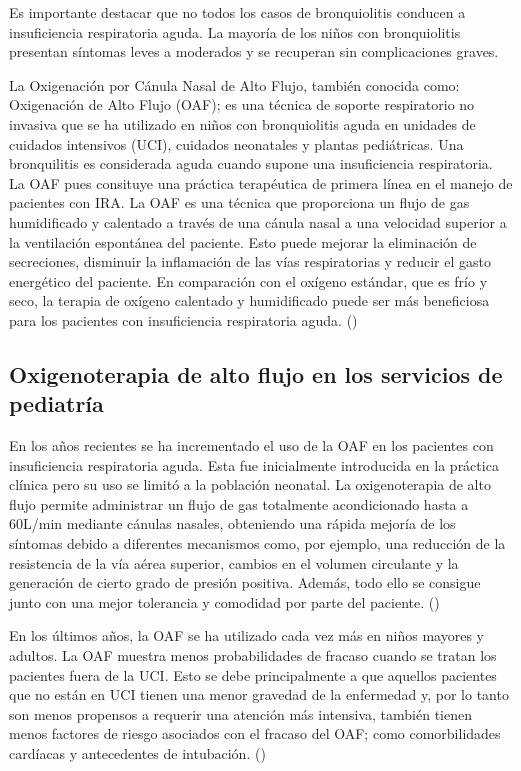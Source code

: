 Es importante destacar que no todos los casos de bronquiolitis conducen a insuficiencia respiratoria aguda. La mayoría de los niños con bronquiolitis presentan síntomas leves a moderados y se recuperan sin complicaciones graves. 

La Oxigenación por Cánula Nasal de Alto Flujo, también conocida como: Oxigenación de Alto Flujo (OAF); es una técnica de soporte respiratorio no invasiva que se ha utilizado en niños con bronquiolitis aguda en unidades de cuidados intensivos (UCI), cuidados neonatales y plantas pediátricas. Una bronquilitis es considerada aguda cuando supone una insuficiencia respiratoria. La OAF pues consituye una práctica terapéutica de primera línea en el manejo de pacientes con IRA. La OAF es una técnica que proporciona un flujo de gas humidificado y calentado a través de una cánula nasal a una velocidad superior a la ventilación espontánea del paciente. Esto puede mejorar la eliminación de secreciones, disminuir la inflamación de las vías respiratorias y reducir el gasto energético del paciente. En comparación con el oxígeno estándar, que es frío y seco, la terapia de oxígeno calentado y humidificado puede ser más beneficiosa para los pacientes con insuficiencia respiratoria aguda. (\cite{Daverio2019})


\subsection{Oxigenoterapia de alto flujo en los servicios de pediatría} 

En los años recientes se ha incrementado el uso de la OAF en los pacientes con insuficiencia respiratoria aguda. Esta fue inicialmente introducida en la práctica clínica pero su uso se limitó a la población neonatal. La oxigenoterapia de alto flujo permite administrar un flujo de gas totalmente acondicionado hasta a 60L/min mediante cánulas nasales, obteniendo una rápida mejoría de los síntomas debido a diferentes mecanismos como, por ejemplo, una reducción de la resistencia de la vía aérea superior, cambios en el volumen circulante y la generación de cierto grado de presión positiva. Además, todo ello se consigue junto con una mejor tolerancia y comodidad por parte del paciente. (\cite{Masclans2015})

En los últimos años, la OAF se ha utilizado cada vez más en niños mayores y adultos. La OAF muestra menos probabilidades de fracaso cuando se tratan los pacientes fuera de la UCI. Esto se debe principalmente a que aquellos pacientes que no están en UCI tienen una menor gravedad de la enfermedad y, por lo tanto son menos propensos a requerir una atención más intensiva, también tienen menos factores de riesgo asociados con el fracaso del OAF; como comorbilidades cardíacas y antecedentes de intubación. (\cite{Betters2017}) 

